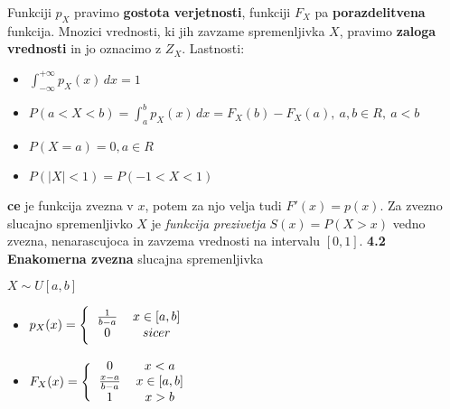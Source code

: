\documentclass{article}
\begin{document}
\begin{multicols}{3}
Funkciji $p_{X}$ pravimo \textbf{gostota verjetnosti}, funkciji $F_{X}$ pa
\textbf{porazdelitvena} funkcija. Mnozici vrednosti, ki jih zavzame spremenljivka
$X$, pravimo \textbf{zaloga vrednosti} in jo oznacimo z $Z_{X}$.
Lastnosti:
\begin{itemize}
    \item \begin{math}
        \int_{- \infty}^{+ \infty} p_{X}(x) \,dx = 1
    \end{math}
    \item \begin{math}
        P(a < X < b) = \int_{a}^{b} p_{X}(x) \,dx = F_{X}(b) - F_{X}(a),\: a,b \in R,\: a < b
    \end{math}
    \item \begin{math}
        P(X = a) = 0, a \in R
    \end{math}
    \item \begin{math}
        P(|X| < 1) = P(-1 < X < 1)
    \end{math}
\end{itemize}
\textbf{ce} je funkcija zvezna v $x$, potem za njo velja tudi $F'(x) = p(x)$.
Za zvezno slucajno spremenljivko $X$ je \textit{funkcija prezivetja} $S(x) = P(X > x)$
vedno zvezna, nenarascujoca in zavzema vrednosti na intervalu $[0, 1]$.
\textbf{4.2 Enakomerna zvezna} slucajna spremenljivka
\begin{center}
    \begin{math}
        X \sim U[a, b]
    \end{math}
\end{center}

\begin{itemize}
    \item  \begin{math}
        p_{X}(x) =
        \Bigg \{\begin{tabular}{ccc}
          $\frac{1}{b-a}$  & $x \in [a, b]$ & \\
          $0$ & $sicer$ & \\
        \end{tabular}
    \end{math} 
    
     \item \begin{math}
        F_{X}(x) =
        \Bigg \{\begin{tabular}{ccc}
          $0$ & $x < a$ & \\
          $\frac{x - a}{b - a}$  & $x \in [a, b]$ & \\
          $1$ & $x > b$  & \\
        \end{tabular}
    \end{math}
\end{itemize}


\end{multicols}
\end{document}
